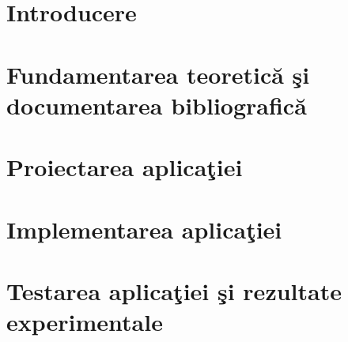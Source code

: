 \documentclass[a4paper,12pt,twoside]{memoir}
\begin{document}
\setmainfont{CMU Serif}

% 

\pagestyle{xpagestyle}%
\tocless
\cleardoublepage

\tocless\tableofcontents
\cleardoublepage

\mainmatter
\pagestyle{xpagestyle}%
 
\chapter{Introducere}
\label{ch:introduction}

\cleardoublepage
 
\chapter{Fundamentarea teoretică şi documentarea bibliografică}
\label{ch:fundamentals}

\cleardoublepage

\chapter{Proiectarea aplicaţiei}
\label{ch:design}

\cleardoublepage

\chapter{Implementarea aplicaţiei}
\label{ch:implementation}

\cleardoublepage

\chapter{Testarea aplicaţiei şi rezultate experimentale}
\label{ch:results}

\cleardoublepage
\end{document}
